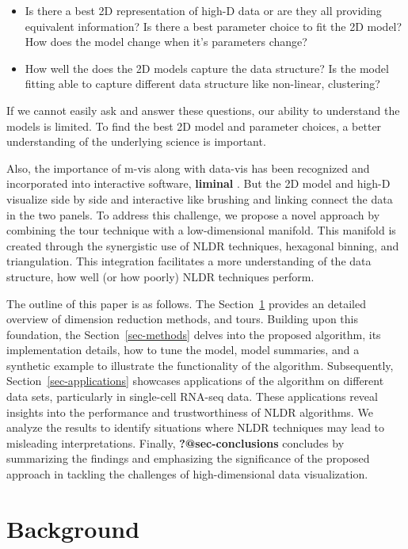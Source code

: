 \documentclass[
  12pt]{article}
\begin{document}
\begin{itemize}
\item
  Is there a best 2D representation of high-D data or are they all
  providing equivalent information? Is there a best parameter choice to
  fit the 2D model? How does the model change when it's parameters
  change?
\item
  How well the does the 2D models capture the data structure? Is the
  model fitting able to capture different data structure like
  non-linear, clustering?
\end{itemize}

If we cannot easily ask and answer these questions, our ability to
understand the models is limited. To find the best 2D model and
parameter choices, a better understanding of the underlying science is
important.

Also, the importance of m-vis along with data-vis has been recognized
and incorporated into interactive software, \textbf{liminal}
\citep{article21}. But the 2D model and high-D visualize side by side
and interactive like brushing and linking connect the data in the two
panels. To address this challenge, we propose a novel approach by
combining the tour technique with a low-dimensional manifold. This
manifold is created through the synergistic use of NLDR techniques,
hexagonal binning, and triangulation. This integration facilitates a
more understanding of the data structure, how well (or how poorly) NLDR
techniques perform.

The outline of this paper is as follows. The
Section~\ref{sec-background} provides an detailed overview of dimension
reduction methods, and tours. Building upon this foundation, the
Section~\ref{sec-methods} delves into the proposed algorithm, its
implementation details, how to tune the model, model summaries, and a
synthetic example to illustrate the functionality of the algorithm.
Subsequently, Section~\ref{sec-applications} showcases applications of
the algorithm on different data sets, particularly in single-cell
RNA-seq data. These applications reveal insights into the performance
and trustworthiness of NLDR algorithms. We analyze the results to
identify situations where NLDR techniques may lead to misleading
interpretations. Finally, \textbf{?@sec-conclusions} concludes by
summarizing the findings and emphasizing the significance of the
proposed approach in tackling the challenges of high-dimensional data
visualization.

\hypertarget{sec-background}{%
\section{Background}\label{sec-background}}
\end{document}
